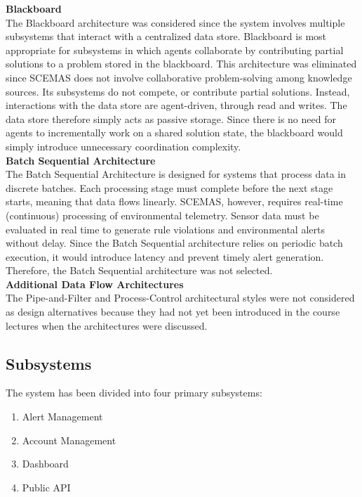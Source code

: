 \documentclass[]{article}
\begin{document}
\noindent \textbf{Blackboard} \\
The Blackboard architecture was considered since the system involves multiple subsystems that interact with a centralized data store. Blackboard is most appropriate for subsystems in which agents collaborate by contributing partial solutions to a problem stored in the blackboard. 
This architecture was eliminated since SCEMAS does not involve collaborative problem-solving among knowledge sources. Its subsystems do not compete, or contribute partial solutions. Instead, interactions with the data store are agent-driven, through read and writes. The data store therefore simply acts as passive storage. Since there is no need for agents to incrementally work on a shared solution state, the blackboard would simply introduce unnecessary coordination complexity. \\

\noindent \textbf{Batch Sequential Architecture} \\
The Batch Sequential Architecture is designed for systems that process data in discrete batches. Each processing stage must complete before the next stage starts, meaning that data flows linearly. SCEMAS, however, requires real-time (continuous) processing of environmental telemetry. Sensor data must be evaluated in real time to generate rule violations and environmental alerts without delay. Since the Batch Sequential architecture relies on periodic batch execution, it would introduce latency and prevent timely alert generation. Therefore, the Batch Sequential architecture was not selected. \\

\noindent \textbf{Additional Data Flow Architectures} \\
The Pipe-and-Filter and Process-Control architectural styles were not considered as design alternatives because they had not yet been introduced in the course lectures when the architectures were discussed.

\subsection{Subsystems}
\label{sub:subsystems}
The system has been divided into four primary subsystems: 
\begin{enumerate}
    \item Alert Management
    \item Account Management 
    \item Dashboard
    \item Public API
\end{enumerate}
\end{document}
